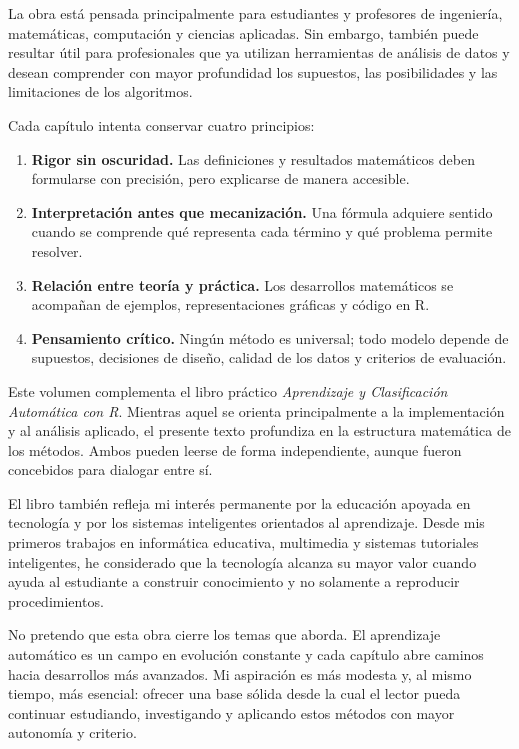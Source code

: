 \documentclass[
  spanish,
  10.5pt,
  letterpaper,
  DIV=11,
  numbers=noendperiod,
  oneside,
  open=any]{scrreprt}
\providecommand{\tightlist}{%
  \setlength{\itemsep}{0pt}\setlength{\parskip}{0pt}}
\theoremstyle{definition}
\theoremstyle{definition}
\theoremstyle{plain}
\theoremstyle{remark}
\begin{document}
La obra está pensada principalmente para estudiantes y profesores de
ingeniería, matemáticas, computación y ciencias aplicadas. Sin embargo,
también puede resultar útil para profesionales que ya utilizan
herramientas de análisis de datos y desean comprender con mayor
profundidad los supuestos, las posibilidades y las limitaciones de los
algoritmos.

Cada capítulo intenta conservar cuatro principios:

\begin{enumerate}
\def\labelenumi{\arabic{enumi}.}
\tightlist
\item
  \textbf{Rigor sin oscuridad.} Las definiciones y resultados
  matemáticos deben formularse con precisión, pero explicarse de manera
  accesible.
\item
  \textbf{Interpretación antes que mecanización.} Una fórmula adquiere
  sentido cuando se comprende qué representa cada término y qué problema
  permite resolver.
\item
  \textbf{Relación entre teoría y práctica.} Los desarrollos matemáticos
  se acompañan de ejemplos, representaciones gráficas y código en R.
\item
  \textbf{Pensamiento crítico.} Ningún método es universal; todo modelo
  depende de supuestos, decisiones de diseño, calidad de los datos y
  criterios de evaluación.
\end{enumerate}

Este volumen complementa el libro práctico \emph{Aprendizaje y
Clasificación Automática con R}. Mientras aquel se orienta
principalmente a la implementación y al análisis aplicado, el presente
texto profundiza en la estructura matemática de los métodos. Ambos
pueden leerse de forma independiente, aunque fueron concebidos para
dialogar entre sí.

El libro también refleja mi interés permanente por la educación apoyada
en tecnología y por los sistemas inteligentes orientados al aprendizaje.
Desde mis primeros trabajos en informática educativa, multimedia y
sistemas tutoriales inteligentes, he considerado que la tecnología
alcanza su mayor valor cuando ayuda al estudiante a construir
conocimiento y no solamente a reproducir procedimientos.

No pretendo que esta obra cierre los temas que aborda. El aprendizaje
automático es un campo en evolución constante y cada capítulo abre
caminos hacia desarrollos más avanzados. Mi aspiración es más modesta y,
al mismo tiempo, más esencial: ofrecer una base sólida desde la cual el
lector pueda continuar estudiando, investigando y aplicando estos
métodos con mayor autonomía y criterio.
\end{document}
